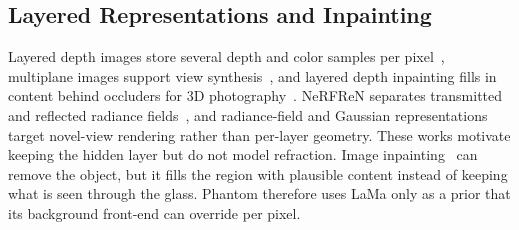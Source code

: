\subsection{Layered Representations and Inpainting}
Layered depth images store several depth and color samples per pixel~\cite{ldi}, multiplane images support view synthesis~\cite{stereomag,mpi}, and layered depth inpainting fills in content behind occluders for 3D photography~\cite{photo3d}.
NeRFReN separates transmitted and reflected radiance fields~\cite{nerfren}, and radiance-field and Gaussian representations~\cite{nerf,gs3d,pixelsplat,mvsplat} target novel-view rendering rather than per-layer geometry.
These works motivate keeping the hidden layer but do not model refraction.
Image inpainting~\cite{partialconv,contextual,gatedconv,lama,mat} can remove the object, but it fills the region with plausible content instead of keeping what is seen through the glass.
Phantom therefore uses LaMa only as a prior that its background front-end can override per pixel.
